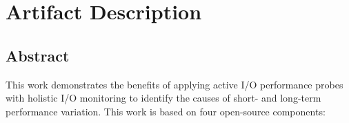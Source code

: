 \appendix

\section{Artifact Description} \label{sec:appendix/artifacts}

\subsection{Abstract}

This work demonstrates the benefits of applying active I/O performance probes with holistic I/O monitoring to identify the causes of short- and long-term performance variation.
This work is based on four open-source components: 


